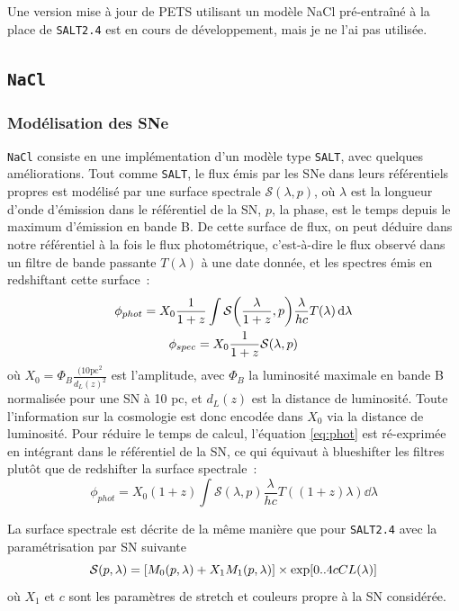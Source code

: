 \documentclass{book}
\def\nacl{\texttt{NaCl}\xspace}
\def\saltd{\texttt{SALT2.4}\xspace}
\let\mcl\mathcal
\begin{document}
Une version mise à jour de PETS utilisant un modèle NaCl pré-entraîné à la place de \saltd est en cours de développement, mais je ne l'ai pas utilisée.


\subsection{\nacl}
\label{anx:nacl}

\subsubsection{Modélisation des SNe}

\nacl consiste en une implémentation d'un modèle type \texttt{SALT}, avec quelques améliorations. Tout comme \texttt{SALT}, le flux émis par les SNe dans leurs référentiels propres est modélisé par une surface spectrale $\mcl S(\lambda, p)$, où $\lambda$ est la longueur d'onde d'émission dans le référentiel de la SN, $p$, la phase, est le temps depuis le maximum d'émission en bande B.
De cette surface de flux, on peut déduire dans notre référentiel à la fois le flux photométrique, c'est-à-dire le flux observé dans un filtre de bande passante $T(\lambda)$ à une date donnée, et les spectres émis en redshiftant cette surface~:
\begin{gather}
	\phi_{phot} = X_0 \frac{1}{1+z} \int \mcl S\qty(\frac{\lambda}{1+z}, p) \frac{\lambda}{hc} T(\lambda) \dd{\lambda} \label{eq:phot}\\
	\phi_{spec}  = X_0 \frac{1}{1+z} \mcl S(\lambda, p) \label{eq:spec}
\end{gather}
où $X_0 = \Phi_B \frac{(10\text{pc}^2}{d_L(z)^2}$ est l'amplitude, avec $\Phi_B$ la luminosité maximale en bande B normalisée pour une SN à 10 pc, et $d_L(z)$ est la distance de luminosité. Toute l'information sur la cosmologie est donc encodée dans $X_0$ via la distance de luminosité.
Pour réduire le temps de calcul, l'équation \ref{eq:phot} est ré-exprimée en intégrant dans le référentiel de la SN, ce qui équivaut à blueshifter les filtres plutôt que de redshifter la surface spectrale~:
\begin{equation}
	\phi_{phot} = X_0 (1+z) \int \mcl S(\lambda, p) \frac{\lambda}{hc} T((1+z)\lambda) \dd{\lambda}
\end{equation}

La surface spectrale est décrite de la même manière que pour \saltd avec la paramétrisation par SN suivante
\begin{equation}
    \mcl S (p, \lambda) = \qty[M_0(p, \lambda) + X_1 M_1(p, \lambda)] \times \exp[0..4 c CL(\lambda)]
\end{equation}
où $X_1$ et $c$ sont les paramètres de stretch et couleurs propre à la SN considérée.
\end{document}
